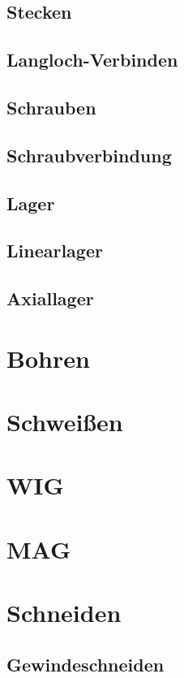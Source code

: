 \documentclass[
	a4paper,
	smallheadings,
	german,
	]
	{scrreprt}
\begin{document}
	\subsection{Stecken}
	\subsection{Langloch-Verbinden}
	\subsection{Schrauben}
		\subsection{Schraubverbindung}
	\subsection{Lager}
		\subsection{Linearlager}
		\subsection{Axiallager}
\section{Bohren}
\section{Schweißen}
	\section{WIG}
	\section{MAG}
\section{Schneiden}
\subsection{Gewindeschneiden}


\printbibliography
\end{document}
